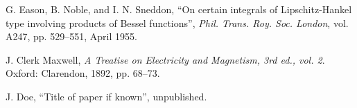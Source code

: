 \documentclass[conference, 10pt]{IEEEtran}
\begin{document}
%
%
%
\begin{thebibliography}{1}


G. Eason, B. Noble, and I. N. Sneddon, ``On certain integrals of Lipschitz-Hankel type involving products of Bessel functions'', \emph{Phil. Trans. Roy. Soc. London}, vol. A247, pp. 529--551, April 1955.

J. Clerk Maxwell, \emph{A Treatise on Electricity and Magnetism, 3rd ed., vol. 2}. Oxford: Clarendon, 1892, pp. 68--73.

J. Doe, ``Title of paper if known'', unpublished.
\end{thebibliography}




\end{document}

